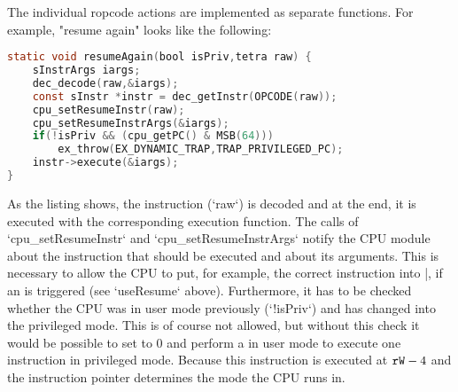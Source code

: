 The individual ropcode actions are implemented as separate functions. For example, "resume again" looks like the following:
\begin{lstlisting}[language=C,caption={Implementation of the "resume again" action}]
static void resumeAgain(bool isPriv,tetra raw) {
	sInstrArgs iargs;
	dec_decode(raw,&iargs);
	const sInstr *instr = dec_getInstr(OPCODE(raw));
	cpu_setResumeInstr(raw);
	cpu_setResumeInstrArgs(&iargs);
	if(!isPriv && (cpu_getPC() & MSB(64)))
		ex_throw(EX_DYNAMIC_TRAP,TRAP_PRIVILEGED_PC);
	instr->execute(&iargs);
}
\end{lstlisting}
As the listing shows, the instruction (`raw`) is decoded and at the end, it is executed with the corresponding execution function. The calls of `cpu_setResumeInstr` and `cpu_setResumeInstrArgs` notify the CPU module about the instruction that should be executed and about its arguments. This is necessary to allow the CPU to put, for example, the correct instruction into |, if an  is triggered (see `useResume` above). Furthermore, it has to be checked whether the CPU was in user mode previously (`!isPriv`) and has changed into the privileged mode. This is of course not allowed, but without this check it would be possible to set  to 0 and perform a  in user mode to execute one instruction in privileged mode. Because this instruction is executed at ${\tt rW}-4$ and the instruction pointer determines the mode the CPU runs in.

